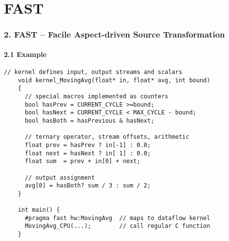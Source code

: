 \section{FAST}

\begin{frame}[fragile]
  \frametitle{2. FAST -- Facile Aspect-driven Source Transformation}
  \framesubtitle{2.1 Example}

  \begin{lstlisting}[style=MaxC,   basicstyle=\scriptsize]
    // kernel defines input, output streams and scalars
    void kernel_MovingAvg(float* in, float* avg, int bound)
    {
      // special macros implemented as counters
      bool hasPrev = CURRENT_CYCLE >=bound;
      bool hasNext = CURRENT_CYCLE < MAX_CYCLE - bound;
      bool hasBoth = hasPrevious & hasNext;

      // ternary operator, stream offsets, arithmetic
      float prev = hasPrev ? in[-1] : 0.0;
      float next = hasNext ? in[ 1] : 0.0;
      float sum  = prev + in[0] + next;

      // output assignment
      avg[0] = hasBoth? sum / 3 : sum / 2;
    }

    int main() {
      #pragma fast hw:MovingAvg  // maps to dataflow kernel
      MovingAvg_CPU(...);        // call regular C function
    }
  \end{lstlisting}
\end{frame}

